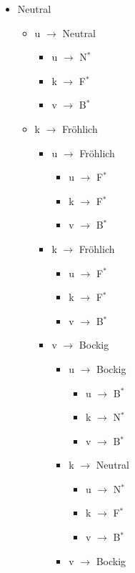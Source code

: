 \documentclass[
	fontsize=12pt,          %
	paper=a4,               %
	numbers=noenddot,       %
	listof=totoc,           %
	listof=entryprefix,     %
	listof=nochaptergap,    %
	bibliography=totoc,     %
	parskip=half,           %
	openany                 %
]{scrbook}
\begin{document}
\begin{itemize}
	\item Neutral
	\begin{itemize}
		\item u $\rightarrow$ Neutral
		\begin{itemize}
			\item u $\rightarrow$ N$^*$ \quad
			\item k $\rightarrow$ F$^*$ \quad
			\item v $\rightarrow$ B$^*$
		\end{itemize}
		\item k $\rightarrow$ Fröhlich
		\begin{itemize}
			\item u $\rightarrow$ Fröhlich
			\begin{itemize}
				\item u $\rightarrow$ F$^*$ \quad
				\item k $\rightarrow$ F$^*$ \quad
				\item v $\rightarrow$ B$^*$
			\end{itemize}
			\item k $\rightarrow$ Fröhlich
			\begin{itemize}
				\item u $\rightarrow$ F$^*$ \quad
				\item k $\rightarrow$ F$^*$ \quad
				\item v $\rightarrow$ B$^*$
			\end{itemize}
			\item v $\rightarrow$ Bockig
			\begin{itemize}
				\item u $\rightarrow$ Bockig
				\begin{itemize}
					\item u $\rightarrow$ B$^*$ \quad
					\item k $\rightarrow$ N$^*$ \quad
					\item v $\rightarrow$ B$^*$
				\end{itemize}
				\item k $\rightarrow$ Neutral
				\begin{itemize}
					\item u $\rightarrow$ N$^*$ \quad
					\item k $\rightarrow$ F$^*$ \quad
					\item v $\rightarrow$ B$^*$
				\end{itemize}
				\item v $\rightarrow$ Bockig
				\begin{itemize}

\end{itemize}
\end{itemize}
\end{itemize}
\end{itemize}
\end{itemize}
\end{document}
